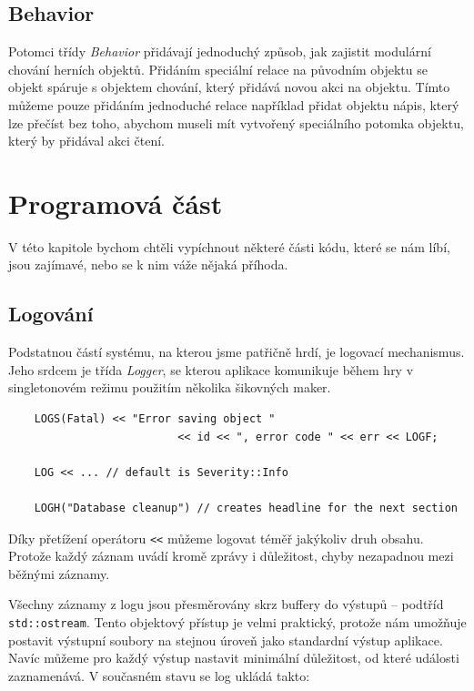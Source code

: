 \documentclass[11pt, a4paper]{article}
\def\class#1{\emph{#1}}
\begin{document}
\subsection{Behavior}

Potomci třídy \class{Behavior} přidávají jednoduchý způsob, jak zajistit modulární chování herních objektů. Přidáním speciální relace na původním objektu se objekt spáruje s objektem chování, který přidává novou akci na objektu. Tímto můžeme pouze přidáním jednoduché relace například přidat objektu nápis, který lze přečíst bez toho, abychom museli mít vytvořený speciálního potomka objektu, který by přidával akci čtení.

\section{Programová část}

V této kapitole bychom chtěli vypíchnout některé části kódu, které se nám líbí, jsou zajímavé, nebo se k nim váže nějaká příhoda.

\subsection{Logování}

Podstatnou částí systému, na kterou jsme patřičně hrdí, je logovací mechanismus. Jeho srdcem je třída \class{Logger}, se kterou aplikace komunikuje během hry v singletonovém režimu použitím několika šikovných maker.

\begin{lstlisting}
	LOGS(Fatal) << "Error saving object "
	                      << id << ", error code " << err << LOGF;
	                      
    LOG << ... // default is Severity::Info
    
    LOGH("Database cleanup") // creates headline for the next section
\end{lstlisting} 

\noindent
Díky přetížení operátoru \texttt{<<} můžeme logovat téměř jakýkoliv druh obsahu. Protože každý záznam uvádí kromě zprávy i důležitost, chyby nezapadnou mezi běžnými záznamy.

Všechny záznamy z logu jsou přesměrovány skrz buffery do výstupů – podtříd \texttt{std::ostream}. Tento objektový přístup je velmi praktický, protože nám umožňuje postavit výstupní soubory na stejnou úroveň jako standardní výstup aplikace. Navíc můžeme pro každý výstup nastavit minimální důležitost, od které události zaznamenává. V současném stavu se log ukládá takto:
\end{document}
